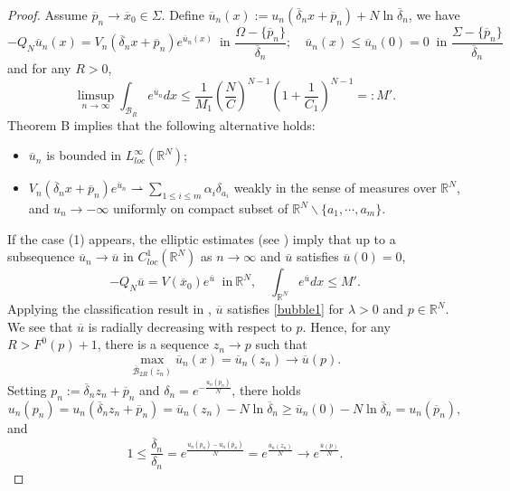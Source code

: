 \documentclass[11pt]{amsart}
\numberwithin{equation}{section}
\newcommand{\R}{\mathbb{R}}
\begin{document}
\begin{proof}
Assume $\overline{p}_{n}\rightarrow\overline{x}_{0}\in\Sigma$. Define $\overline{u}_{n}(x):=u_{n}(\overline{\delta}_{n}x+\overline{p}_{n})+N\ln\overline{\delta}_{n}$, we have
$$-Q_{N}\overline{u}_{n}(x) =V_{n}(\overline{\delta}_{n}x+\overline{p}_{n})e^{\overline{u}_{n}(x)} \:\; \mbox{in }  \frac{\Omega-{\{\overline{p}_{n}}\}}{\overline{\delta}_{n}}; \quad \overline{u}_{n}(x) \leq \overline{u}_{n}(0) = 0\;\; \mbox{in } \frac{\Sigma-{\{\overline{p}_{n}}\}}{\overline{\delta}_{n}}$$
and for any $R > 0$,
$$
\limsup\limits_{n\rightarrow\infty}\int_{\mathcal{B}_{R}}e^{\overline{u}_{n}}dx \leq \frac{1}{M_1}\left(\frac{N}{C}\right)^{N-1}\left(1+\frac{1}{C_{1}}\right)^{N-1} =:M'.$$
Theorem B implies that the following alternative holds:
\begin{itemize}
\item[(1)] $\overline{u}_{n}$ is bounded in $L_{loc}^{\infty}(\R^N)$;
\item[(2)] $V_{n}(\overline{\delta}_{n}x+\overline{p}_{n})e^{\overline{u}_{n}}\rightharpoonup \sum_{1\le i \le m}\alpha_{i}\delta_{a_{i}}$ weakly in the sense of measures over $\mathbb{R}^{N}$, and $u_{n}\rightarrow-\infty$ uniformly on compact subset of $\mathbb{R}^{N}\backslash\{a_{1},\cdots,a_m\}$.
\end{itemize}

If the case (1) appears, the elliptic estimates (see \cite{D1983}) imply that up to a subsequence $\overline{u}_{n}\rightarrow \overline{u}$ in $C^1_{loc}(\mathbb{R}^N)$ as $n\rightarrow\infty$ and $\overline{u}$ satisfies $\overline u(0)=0$,
$$
-Q_{N}\overline{u} = V(\overline{x}_{0})e^{\overline{u}} \;\; \mbox{in} ~\mathbb{R}^{N},\quad
\int_{\mathbb{R}^{N}}e^{\overline{u}}dx \leq M'.$$
Applying the classification result in \cite{CL2023}, $\overline{u}$ satisfies \eqref{bubble1} for $\lambda >0$ and $p \in \R^N$.
We see that $\overline{u}$ is radially decreasing with respect to $p$. Hence, for any $R> F^0(p) + 1$, there is a sequence $z_{n}\rightarrow p$ such that
$$\max_{\overline{\mathcal{B}}_{2R}(z_{n})}\overline{u}_{n}(x) = \overline{u}_{n}(z_{n}) \rightarrow \overline{u}(p).$$
Setting $p_{n}:=\overline{\delta}_{n}z_{n}+\overline{p}_{n}$ and $\delta_{n}=e^{-\frac{u_{n}(p_{n})}{N}}$, there holds
$$u_{n}(p_{n})=u_{n}(\overline{\delta}_{n}z_{n}+\overline{p}_{n})=\overline{u}_{n}(z_{n})-N\ln\overline{\delta}_{n}\geq \overline{u}_{n}(0) - N\ln\overline{\delta}_{n}=u_{n}(\overline{p}_{n}),$$
and
$$1\leq \frac{\overline{\delta}_{n}}{\delta_{n}}=e^{\frac{u_{n}(p_n)-u_{n}(\overline{p}_{n})}{N}}=e^{\frac{\overline{u}_{n}(z_{n})}{N}}\rightarrow e^{\frac{\overline{u}(p)}{N}}.$$


\end{proof}
\end{document}

